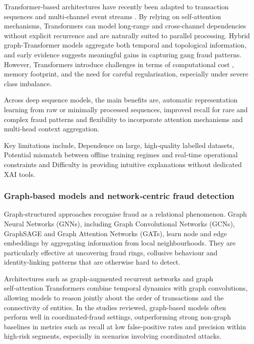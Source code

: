 \documentclass[a4paper,fleqn]{cas-dc}
\begin{document}
Transformer‑based architectures have recently been adapted to transaction sequences and multi‑channel event streams \cite{kandi_enhancing_2025}. 
By relying on self‑attention mechanisms, Transformers can model long‑range and cross‑channel dependencies without explicit recurrence and are naturally suited to parallel processing. 
Hybrid graph‑Transformer models aggregate both temporal and topological information, and early evidence suggests meaningful gains in capturing gang fraud patterns. 
However, Transformers introduce challenges in terms of computational cost \cite{ileberi_hybrid_2024}, memory footprint, and the need for careful regularisation, especially under severe class imbalance.

Across deep sequence models, the main benefits are, automatic representation learning from raw or minimally processed sequences, improved recall for rare and complex fraud patterns and flexibility to incorporate attention mechanisms and multi‑head context aggregation.

Key limitations include, Dependence on large, high‑quality labelled datasets, Potential mismatch between offline training regimes and real‑time operational constraints and	Difficulty in providing intuitive explanations without dedicated XAI tools.

\subsubsection{Graph‑based models and network‑centric fraud detection}

Graph‑structured approaches recognise fraud as a relational phenomenon.
Graph Neural Networks (GNNs), including Graph Convolutional Networks (GCNs), GraphSAGE and Graph Attention Networks (GATs), learn node and edge embeddings by aggregating information from local neighbourhoods. 
They are particularly effective at uncovering fraud rings, collusive behaviour and identity‑linking patterns that are otherwise hard to detect.

Architectures such as graph‑augmented recurrent networks and graph self‑attention Transformers combine temporal dynamics with graph convolutions, allowing models to reason jointly about the order of transactions and the connectivity of entities. 
In the studies reviewed, graph-based models often perform well in coordinated-fraud settings, outperforming strong non‑graph baselines in metrics such as recall at low false‑positive rates and precision within high‑risk segments, especially in scenarios involving coordinated attacks.
\end{document}
